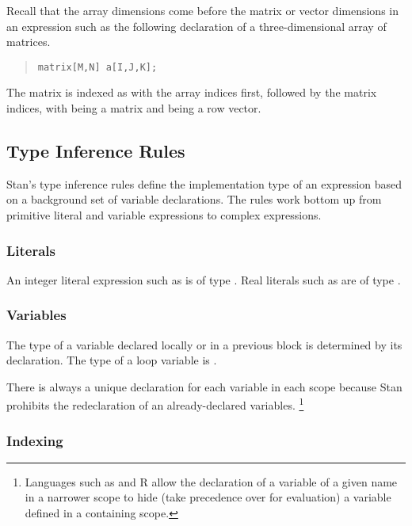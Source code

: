 Recall that the array dimensions come before the matrix or vector
dimensions in an expression such as the following declaration of a
three-dimensional array of matrices.
%
\begin{quote}
\begin{Verbatim}
matrix[M,N] a[I,J,K];
\end{Verbatim}
\end{quote}
%
The matrix  is indexed as  with the array
indices first, followed by the matrix indices, with 
being a matrix and  being a row vector.

\subsection{Type Inference Rules}

Stan's type inference rules define the implementation type of an
expression based on a background set of variable declarations.  The
rules work bottom up from primitive literal and variable expressions
to complex expressions.

\subsubsection{Literals}

An integer literal expression such as  is of type .
Real literals such as  are of type .

\subsubsection{Variables}

The type of a variable declared locally or in a previous block is
determined by its declaration.  The type of a loop variable is
.  

There is always a unique declaration for each variable in each scope
because Stan prohibits the redeclaration of an already-declared
variables.%
%
\footnote{Languages such as \Cpp and R allow the declaration of a
  variable of a given name in a narrower scope to hide (take
  precedence over for evaluation) a variable defined in a containing
  scope.}

\subsubsection{Indexing}


